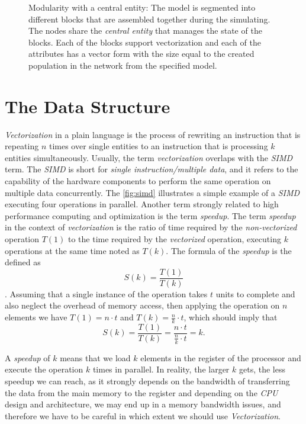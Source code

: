 \begin{figure}[ht!]
\begin{tikzpicture}[x=0.75pt,y=0.75pt,yscale=-1,xscale=1]
\end{tikzpicture}

    \caption{Modularity with a central entity: The model is segmented into different blocks that are assembled together during the simulating. The nodes share the \emph{central entity} that manages the state of the blocks. Each of the blocks support vectorization and each of the attributes has a vector form with the size equal to the created population in the network from the specified model.}
    \label{fig:central_entity}
\end{figure}

\section{The Data Structure}

\emph{Vectorization} in a plain language is the process of rewriting an instruction that is repeating $n$ times over single entities to an instruction that is processing $k$ entities simultaneously. Usually, the term \emph{vectorization} overlaps with the \emph{SIMD} term. The \emph{SIMD} is short for \emph{single instruction/multiple data}, and it refers to the capability of the hardware components to perform the same operation on multiple data concurrently. The \autoref{fig:simd} illustrates a simple example of a \emph{SIMD} executing  four operations in parallel. Another term strongly related to high performance computing and optimization is the term \emph{speedup}. The term \emph{speedup} in the context of \emph{vectorization} is the ratio of time required by the \emph{non-vectorized} operation $T(1)$ to the time required by the \emph{vectorized} operation, executing $k$ operations at the same time noted as $T(k)$. The formula of the \emph{speedup} is the defined as $$S(k) = \frac{T(1)}{T(k)}$$. Assuming that a single instance of the operation takes $t$ units to complete and also neglect the overhead of memory access, then applying the operation on $n$ elements we have $T(1) = n \cdot t$ and $T(k) = \frac{n}{k} \cdot t$, which should imply that $$S(k) = \frac{T(1)}{T(k)} = \frac{n \cdot t}{\frac{n}{k} \cdot t} = k.$$

A \emph{speedup} of $k$ means that we load $k$ elements in the register of the processor and execute the operation $k$ times in parallel. In reality, the larger $k$ gets, the less speedup we can reach, as it strongly depends on the bandwidth of transferring the data from the main memory to the register and depending on the \emph{CPU} design and architecture, we may end up in a memory bandwidth issues, and therefore we have to be careful in which extent we should use  \emph{Vectorization}.\\




